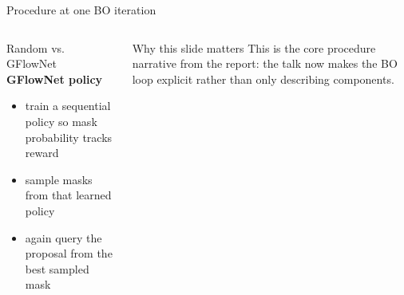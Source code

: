 \documentclass[aspectratio=169]{beamer}
\begin{document}
\begin{frame}{Procedure at one BO iteration}
\begin{columns}[T,onlytextwidth]
\begin{minipage}[t][0.82\textheight]{\linewidth}
\begin{cardG}{Random vs. GFlowNet}
  \textbf{GFlowNet policy}
  \begin{itemize}
    \item train a sequential policy so mask probability tracks reward
    \item sample masks from that learned policy
    \item again query the proposal from the best sampled mask
  \end{itemize}
  \end{cardG}

  \vfill

  \begin{cardW}{Why this slide matters}
  This is the core procedure narrative from the report: the talk now makes the BO loop explicit rather than only describing components.
  \end{cardW}
\end{minipage}
\end{columns}
\end{frame}
\end{document}
